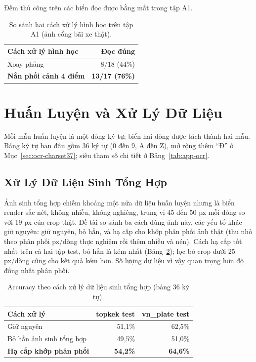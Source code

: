 \begin{table}[htbp]
\centering
\caption{So sánh hai cách xử lý hình học trên tập A1 (ảnh cổng bãi xe thật).}

{\footnotesize Đếm thủ công trên các biển đọc được bằng mắt trong tập A1.}
\label{tab:ocr-perspective}
\begin{tabular}{lr}
\toprule
Cách xử lý hình học & Đọc đúng \\
\midrule
Xoay phẳng & 8/18 (44\%) \\
\textbf{Nắn phối cảnh 4 điểm} & \textbf{13/17 (76\%)} \\
\bottomrule
\end{tabular}
\end{table}

\section{Huấn Luyện và Xử Lý Dữ Liệu}
\label{sec:ocr-caitien}

Mỗi mẫu huấn luyện là một dòng ký tự; biển hai dòng được tách thành hai mẫu. Bảng ký tự ban
đầu gồm 36 ký tự (0 đến 9, A đến Z), mở rộng thêm ``Đ'' ở Mục~\ref{sec:ocr-charset37}; siêu
tham số chi tiết ở Bảng~\ref{tab:app-ocr}.

\subsection{Xử Lý Dữ Liệu Sinh Tổng Hợp}

Ảnh sinh tổng hợp chiếm khoảng một nửa dữ liệu huấn luyện nhưng là biển render sắc nét, không
nhiễu, không nghiêng, trung vị 45 đến 50 px mỗi dòng so với 19 px của crop thật. Đề tài so
sánh ba cách dùng ảnh này, các yếu tố khác giữ nguyên: giữ nguyên, bỏ hẳn, và hạ cấp cho khớp
phân phối ảnh thật (thu nhỏ theo phân phối px/dòng thực nghiệm rồi thêm nhiễu và nén). Cách
hạ cấp tốt nhất trên cả hai tập test, bỏ hẳn là kém nhất (Bảng~\ref{tab:ocr-v0v2}); lọc bỏ
crop dưới 25 px/dòng cũng cho kết quả kém hơn. Số lượng dữ liệu vì vậy quan trọng hơn độ đồng
nhất phân phối.

\begin{table}[htbp]
\centering
\caption{Accuracy theo cách xử lý dữ liệu sinh tổng hợp (bảng 36 ký tự).}

\label{tab:ocr-v0v2}
\begin{tabular}{lrr}
\toprule
Cách xử lý & topkek test & vn\_plate test \\
\midrule
Giữ nguyên & 51,1\% & 62,5\% \\
Bỏ hẳn ảnh sinh tổng hợp & 49,5\% & 51,0\% \\
\textbf{Hạ cấp khớp phân phối} & \textbf{54,2\%} & \textbf{64,6\%} \\
\bottomrule
\end{tabular}
\end{table}

